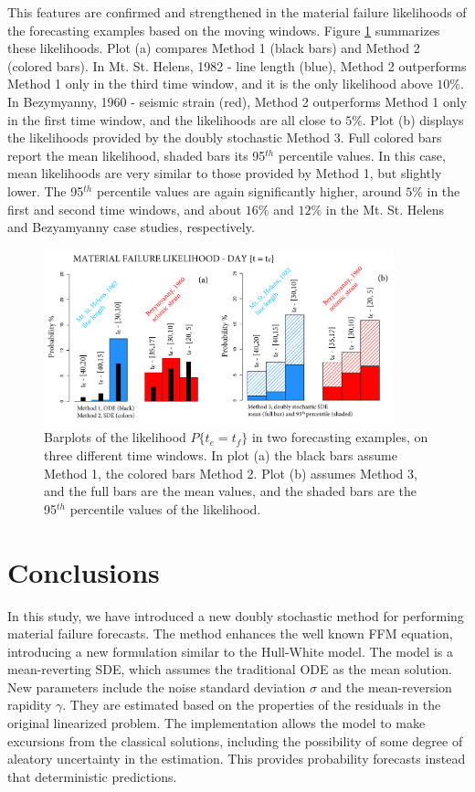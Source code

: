 \documentclass{article}
\begin{document}
This features are confirmed and strengthened in the material failure likelihoods of the forecasting examples based on the moving windows. Figure \ref{Fig16} summarizes these likelihoods. Plot (a) compares Method 1 (black bars) and Method 2 (colored bars). In Mt. St. Helens, 1982 - line length (blue), Method 2 outperforms Method 1 only in the third time window, and it is the only likelihood above $10\%$. In Bezymyanny, 1960 - seismic strain (red), Method 2 outperforms Method 1 only in the first time window, and the likelihoods are all close to $5\%$. Plot (b) displays the likelihoods provided by the doubly stochastic Method 3. Full colored bars report the mean likelihood, shaded bars its 95$^{th}$ percentile values. In this case, mean likelihoods are very similar to those provided by Method 1, but slightly lower. The 95$^{th}$ percentile values are again significantly higher, around $5\%$ in the first and second time windows, and about $16\%$ and $12\%$ in the Mt. St. Helens and Bezyamyanny case studies, respectively.

\begin{figure}[H]
\centering
\includegraphics[width=0.90\textwidth]{Fig16_plus.png}
\caption{Barplots of the likelihood $P\{t_e=t_f\}$ in two forecasting examples, on three different time windows. In plot (a) the black bars assume Method 1, the colored bars Method 2. Plot (b) assumes Method 3, and the full bars are the mean values, and the shaded bars are the 95$^{th}$ percentile values of the likelihood.}
\label{Fig16}
\end{figure}

\section{Conclusions}
In this study, we have introduced a new doubly stochastic method for performing material failure forecasts. The method enhances the well known FFM equation, introducing a new formulation similar to the Hull-White model. The model is a mean-reverting SDE, which assumes the traditional ODE as the mean solution. New parameters include the noise standard deviation $\sigma$ and the mean-reversion rapidity $\gamma$. They are estimated based on the properties of the residuals in the original linearized problem. The implementation allows the model to make excursions from the classical solutions, including the possibility of some degree of aleatory uncertainty in the estimation. This provides probability forecasts instead that deterministic predictions.
\end{document}
